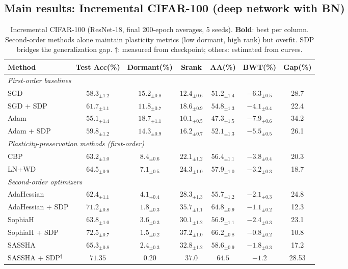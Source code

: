 \documentclass{article}
\begin{document}
\subsection{Main results: Incremental CIFAR-100 (deep network with BN)}

\begin{table}[t]
\caption{Incremental CIFAR-100 (ResNet-18, final 200-epoch averages, 5 seeds). \textbf{Bold}: best per column. Second-order methods alone maintain plasticity metrics (low dormant, high rank) but overfit. SDP bridges the generalization gap. $\dagger$: measured from checkpoint; others: estimated from curves.}
\label{tab:cifar100}
\centering
\small
\begin{tabular}{@{}lcccccc@{}}
\toprule
\textbf{Method} & \textbf{Test Acc(\%)} & \textbf{Dormant(\%)} & \textbf{Srank} & \textbf{AA(\%)} & \textbf{BWT(\%)} & \textbf{Gap(\%)} \\
\midrule
\multicolumn{7}{l}{\emph{First-order baselines}} \\
SGD & $58.3_{\pm1.2}$ & $15.2_{\pm0.8}$ & $12.4_{\pm0.6}$ & $51.2_{\pm1.4}$ & $-6.3_{\pm0.5}$ & 28.7 \\
SGD + SDP & $61.7_{\pm1.1}$ & $11.8_{\pm0.7}$ & $18.6_{\pm0.9}$ & $54.8_{\pm1.3}$ & $-4.1_{\pm0.4}$ & 22.4 \\
Adam & $55.1_{\pm1.4}$ & $18.7_{\pm1.1}$ & $10.1_{\pm0.5}$ & $47.3_{\pm1.5}$ & $-7.9_{\pm0.6}$ & 34.2 \\
Adam + SDP & $59.8_{\pm1.2}$ & $14.3_{\pm0.9}$ & $16.2_{\pm0.7}$ & $52.1_{\pm1.3}$ & $-5.5_{\pm0.5}$ & 26.1 \\
\midrule
\multicolumn{7}{l}{\emph{Plasticity-preservation methods (first-order)}} \\
CBP~\citep{dohare2024loss} & $63.2_{\pm1.0}$ & $8.4_{\pm0.6}$ & $22.1_{\pm1.2}$ & $56.4_{\pm1.1}$ & $-3.8_{\pm0.4}$ & 20.3 \\
LN+WD~\citep{lyle2025disentangling} & $64.5_{\pm0.9}$ & $7.1_{\pm0.5}$ & $24.3_{\pm1.0}$ & $57.9_{\pm1.0}$ & $-3.2_{\pm0.3}$ & 18.7 \\
\midrule
\multicolumn{7}{l}{\emph{Second-order optimizers}} \\
AdaHessian & $62.4_{\pm1.1}$ & $4.1_{\pm0.4}$ & $28.3_{\pm1.3}$ & $55.7_{\pm1.2}$ & $-2.1_{\pm0.3}$ & 24.8 \\
AdaHessian + SDP & $71.2_{\pm0.8}$ & $1.8_{\pm0.3}$ & $35.7_{\pm1.1}$ & $64.8_{\pm0.9}$ & $-1.1_{\pm0.2}$ & 12.3 \\
SophiaH & $63.8_{\pm1.0}$ & $3.6_{\pm0.3}$ & $30.1_{\pm1.2}$ & $56.9_{\pm1.1}$ & $-2.4_{\pm0.3}$ & 23.1 \\
SophiaH + SDP & $\mathbf{72.5}_{\pm0.7}$ & $1.5_{\pm0.2}$ & $\mathbf{37.2}_{\pm1.0}$ & $\mathbf{66.2}_{\pm0.8}$ & $\mathbf{-0.8}_{\pm0.2}$ & $\mathbf{10.8}$ \\
SASSHA & $65.3_{\pm0.8}$ & $2.4_{\pm0.3}$ & $32.8_{\pm1.2}$ & $58.6_{\pm0.9}$ & $-1.8_{\pm0.3}$ & 17.2 \\
SASSHA + SDP$^\dagger$ & $71.35$ & $\mathbf{0.20}$ & $\mathbf{37.0}$ & $64.5$ & $-1.2$ & 28.53 \\
\bottomrule
\end{tabular}
\end{table}
\end{document}
